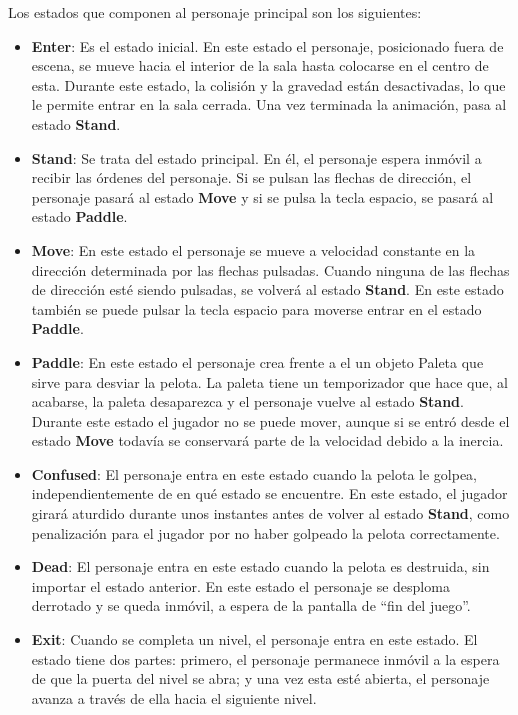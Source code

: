 Los estados que componen al personaje principal son los siguientes:
\begin{itemize}
	\item \textbf{Enter}: Es el estado inicial. En este estado el personaje, posicionado fuera de escena, se mueve hacia el interior de la sala hasta colocarse en el centro de esta. Durante este estado, la colisión y la gravedad están desactivadas, lo que le permite entrar en la sala cerrada. Una vez terminada la animación, pasa al estado \textbf{Stand}.
  	\item \textbf{Stand}: Se trata del estado principal. En él, el personaje espera inmóvil a recibir las órdenes del personaje. Si se pulsan las flechas de dirección, el personaje pasará al estado \textbf{Move} y si se pulsa la tecla espacio, se pasará al estado \textbf{Paddle}.
	\item \textbf{Move}: En este estado el personaje se mueve a velocidad constante en la dirección determinada por las flechas pulsadas. Cuando ninguna de las flechas de dirección esté siendo pulsadas, se volverá al estado \textbf{Stand}. En este estado también se puede pulsar la tecla espacio para moverse entrar en el estado \textbf{Paddle}.
	\item \textbf{Paddle}: En este estado el personaje crea frente a el un objeto Paleta que sirve para desviar la pelota. La paleta tiene un temporizador que hace que, al acabarse, la paleta desaparezca y el personaje vuelve al estado \textbf{Stand}. Durante este estado el jugador no se puede mover, aunque si se entró desde el estado \textbf{Move} todavía se conservará parte de la velocidad debido a la inercia.
	\item \textbf{Confused}: El personaje entra en este estado cuando la pelota le golpea, independientemente de en qué estado se encuentre. En este estado, el jugador girará aturdido durante unos instantes antes de volver al estado \textbf{Stand}, como penalización para el jugador por no haber golpeado la pelota correctamente.
	\item \textbf{Dead}: El personaje entra en este estado cuando la pelota es destruida, sin importar el estado anterior. En este estado el personaje se desploma derrotado y se queda inmóvil, a espera de la pantalla de ``fin del juego''.
    \item \textbf{Exit}: Cuando se completa un nivel, el personaje entra en este estado. El estado tiene dos partes: primero, el personaje permanece inmóvil a la espera de que la puerta del nivel se abra; y una vez esta esté abierta, el personaje avanza a través de ella hacia el siguiente nivel.
\end{itemize}


